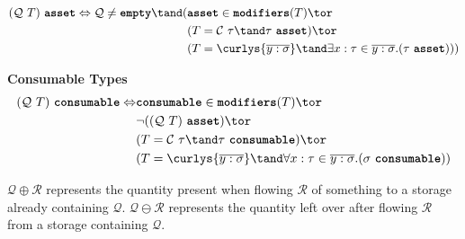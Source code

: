 \documentclass[dvipsnames, usenames, sigconf]{acmart}
\begin{document}
\begin{align*}
    (\mathcal{Q}~T)~\asset \iff \mathcal{Q} \neq \emptyq \tand (& \asset \in \modifiers(T) \tor \\
                                                                & (T = \mathcal{C}~\tau \tand \tau~\asset) \tor \\
                                                                & (T = \curlys{\overline{y : \sigma}} \tand \exists x : \tau \in \overline{y : \sigma}. (\tau~\asset)))
\end{align*}

\framebox{$\tau~\consumable$} \textbf{Consumable Types}
\begin{align*}
    (\mathcal{Q}~T)~\consumable \iff &\consumable \in \modifiers(T) \tor \\
                                     &\lnot((\mathcal{Q}~T)~\asset) \tor \\
                                     &(T = \mathcal{C}~\tau \tand \tau~\consumable) \tor \\
                                     &(T = \curlys{\overline{y : \sigma}} \tand \forall x : \tau \in \overline{y : \sigma}. (\sigma~\consumable))
\end{align*}

$\mathcal{Q} \oplus \mathcal{R}$ represents the quantity present when flowing $\mathcal{R}$ of something to a storage already containing $\mathcal{Q}$.
$\mathcal{Q} \ominus \mathcal{R}$ represents the quantity left over after flowing $\mathcal{R}$ from a storage containing $\mathcal{Q}$.
\end{document}
